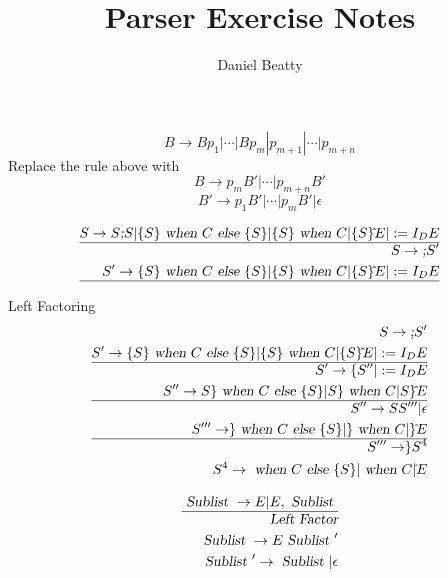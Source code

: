 \documentclass[11pt]{article}
\title{Parser Exercise Notes}
\author{Daniel Beatty}
\begin{document}
\maketitle
\lstset{language=Pascal, numbers=left}

\[ B \to B p_{1} |
  \cdots  |
   B p_{m} |
    p_{m+1} |
     \cdots |
      p_{m+n} \]
Replace the rule above with 
\[  B \to p_m B' | \cdots | p_{m+n} B ' \]
\[ B ' \to p_1 B ' | \cdots | p_m B' |  \epsilon \] 


\begin{eqnarray*}
 S \to S \textsl{;} S | 
\{ S \} \textsl{ when } C \textsl{ else }  \{ S\} |
 \{S \} \textsl{ when } C | 
 \{ S \} \hat{ } E |
  := I_D E \\
  \hline
  S \to  \textsl{;} S' \\
  S' \to  
\{ S \} \textsl{ when } C \textsl{ else }  \{ S\} |
 \{S \} \textsl{ when } C | 
 \{ S \} \hat{ } E |
  := I_D E \\
  \hline
\end{eqnarray*}


   
   Left Factoring
\begin{eqnarray*}
 S \to  \textsl{;} S'  \\
  S' \to  
\{ S \} \textsl{ when } C \textsl{ else }  \{ S\} |
 \{S \} \textsl{ when } C | 
 \{ S \} \hat{ } E |
  := I_D E \\
  \hline
 S' \to \{ S'' |
  := I_D E \\
  S'' \to   
S \} \textsl{ when } C \textsl{ else }  \{ S\} |
S \} \textsl{ when } C | 
S \} \hat{ } E  \\
\hline
S'' \to   S S''' | \epsilon \\
S''' \to 
\} \textsl{ when } C \textsl{ else }  \{ S\} |
 \} \textsl{ when } C | 
  \} \hat{ } E \\
  \hline
  S ''' \to \} S^4 \\
  S^4 \to 
 \textsl{ when } C \textsl{ else }  \{ S\} |
 \textsl{ when } C | 
 \hat{ } E 
\end{eqnarray*}


\begin{eqnarray*}
\textsl{ Sublist } \to E | E, \textsl{ Sublist } \\
\hline
\textsl{Left Factor} \\
\textsl{ Sublist } \to E \textsl{ Sublist }' \\
\textsl{ Sublist }' \to \textsl{ Sublist } | \epsilon 
\end{eqnarray*}
\end{document}
